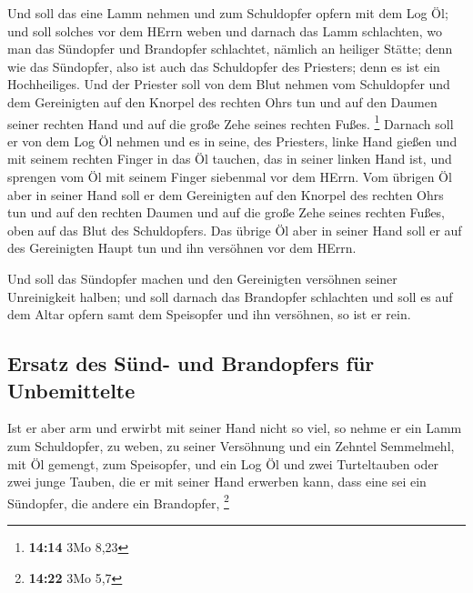  Und soll das eine Lamm nehmen und zum Schuldopfer opfern
mit dem Log Öl; und soll solches vor dem HErrn weben  und
darnach das Lamm schlachten, wo man das Sündopfer und Brandopfer
schlachtet, nämlich an heiliger Stätte; denn wie das Sündopfer, also ist
auch das Schuldopfer des Priesters; denn es ist ein Hochheiliges.
 Und der Priester soll von dem Blut nehmen vom
Schuldopfer und dem Gereinigten auf den Knorpel des rechten Ohrs tun und
auf den Daumen seiner rechten Hand und auf die große Zehe seines rechten
Fußes. \footnote{\textbf{14:14} 3Mo 8,23}  Darnach soll
er von dem Log Öl nehmen und es in seine, des Priesters, linke Hand
gießen  und mit seinem rechten Finger in das Öl tauchen,
das in seiner linken Hand ist, und sprengen vom Öl mit seinem Finger
siebenmal vor dem HErrn.  Vom übrigen Öl aber in seiner
Hand soll er dem Gereinigten auf den Knorpel des rechten Ohrs tun und
auf den rechten Daumen und auf die große Zehe seines rechten Fußes, oben
auf das Blut des Schuldopfers.  Das übrige Öl aber in
seiner Hand soll er auf des Gereinigten Haupt tun und ihn versöhnen vor
dem HErrn.

 Und soll das Sündopfer machen und den Gereinigten
versöhnen seiner Unreinigkeit halben; und soll darnach das Brandopfer
schlachten  und soll es auf dem Altar opfern samt dem
Speisopfer und ihn versöhnen, so ist er rein.

\hypertarget{ersatz-des-suxfcnd--und-brandopfers-fuxfcr-unbemittelte}{%
\subsection{Ersatz des Sünd- und Brandopfers für
Unbemittelte}\label{ersatz-des-suxfcnd--und-brandopfers-fuxfcr-unbemittelte}}

 Ist er aber arm und erwirbt mit seiner Hand nicht so
viel, so nehme er ein Lamm zum Schuldopfer, zu weben, zu seiner
Versöhnung und ein Zehntel Semmelmehl, mit Öl gemengt, zum Speisopfer,
und ein Log Öl  und zwei Turteltauben oder zwei junge
Tauben, die er mit seiner Hand erwerben kann, dass eine sei ein
Sündopfer, die andere ein Brandopfer, \footnote{\textbf{14:22} 3Mo 5,7}

